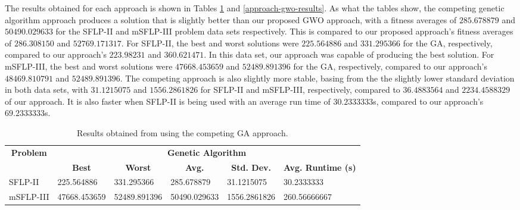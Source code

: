 The results obtained for each approach is shown in Tables \ref{approach-ga-results} and \ref{approach-gwo-results}. As what the tables show, the competing genetic algorithm approach produces a solution that is slightly better than our proposed GWO approach, with a fitness averages of $285.678879$ and $50490.029633$ for the SFLP-II and mSFLP-III problem data sets respectively. This is compared to our proposed approach's fitness averages of $286.308150$ and $52769.171317$. For SFLP-II, the best and worst solutions were $225.564886$ and $331.295366$ for the GA, respectively, compared to our approach's $223.98231$ and $360.621471$. In this data set, our approach was capable of producing the best solution. For mSFLP-III, the best and worst solutions were $47668.453659$ and $52489.891396$ for the GA, respectively, compared to our approach's $48469.810791$ and $52489.891396$. The competing approach is also slightly more stable, basing from the the slightly lower standard deviation in both data sets, with $31.1215075$ and $1556.2861826$ for SFLP-II and mSFLP-III, respectively, compared to $36.4883564$ and $2234.4588329$ of our approach. It is also faster when SFLP-II is being used with an average run time of $30.2333333$s, compared to our approach's $69.2333333$s.

\begin{table}[h!]
\begin{adjustwidth}{-0.855in}{}
\centering
\begin{tabular}{|l|l|l|l|l|l|}
	\hline
	\multicolumn{1}{|c|}{\multirow{2}{*}{\textbf{Problem}}} & \multicolumn{5}{c|}{\textbf{Genetic Algorithm}}                                                                                                                                                                                            \\ \cline{2-6} 
	\multicolumn{1}{|c|}{}                                  & \multicolumn{1}{c|}{\textbf{Best}} & \multicolumn{1}{c|}{\textbf{Worst}} & \multicolumn{1}{c|}{\textbf{Avg.}} & \multicolumn{1}{c|}{\textbf{Std. Dev.}} & \multicolumn{1}{c|}{\textbf{Avg. Runtime (s)}} \\ \hline
	SFLP-II                                                 & 225.564886                                  & 331.295366                                   & 285.678879                      & 31.1215075                                 & 30.2333333                                   \\ \hline
	mSFLP-III                                               & 47668.453659                                & 52489.891396                                 & 50490.029633                      & 1556.2861826                                  & 260.56666667                                   \\ \hline
\end{tabular}
\end{adjustwidth}
\caption{Results obtained from using the competing GA approach.}
\label{approach-ga-results}
\end{table}

